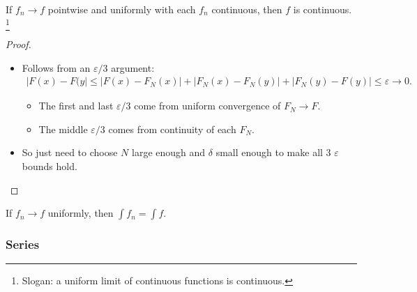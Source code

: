 \begin{theorem}

If \(f_n\to f\) pointwise and uniformly with each \(f_n\) continuous,
then \(f\) is continuous. \footnote{Slogan: a uniform limit of
  continuous functions is continuous.}

\end{theorem}

\begin{proof}

\envlist

\begin{itemize}
\item
  Follows from an \(\varepsilon/3\) argument:
  \begin{align*}  
  {\left\lvert {F(x) - F(y} \right\rvert} \leq 
  {\left\lvert {F(x) - F_N(x)} \right\rvert} + {\left\lvert {F_N(x) - F_N(y)} \right\rvert} + {\left\lvert {F_N(y) - F(y)} \right\rvert} 
  \leq \varepsilon\to 0
  .\end{align*}

  \begin{itemize}
  \tightlist
  \item
    The first and last \(\varepsilon/3\) come from uniform convergence
    of \(F_N\to F\).
  \item
    The middle \(\varepsilon/3\) comes from continuity of each \(F_N\).
  \end{itemize}
\item
  So just need to choose \(N\) large enough and \(\delta\) small enough
  to make all 3 \(\varepsilon\) bounds hold.
\end{itemize}

\end{proof}

\begin{proposition}

If \(f_n \to f\) uniformly, then \(\int f_n = \int f\).

\end{proposition}

\hypertarget{series}{%
\subsubsection{Series}\label{series}}

